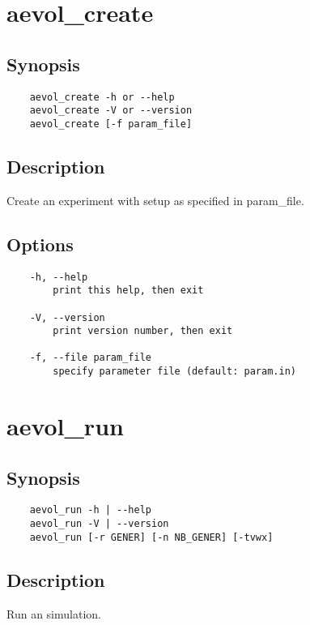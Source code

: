\label{app:manpages}


\section{aevol\_create}
\label{sec:aevol-create}

\subsection*{Synopsis}
\begin{verbatim}
    aevol_create -h or --help
   	aevol_create -V or --version
   	aevol_create [-f param_file]
\end{verbatim}

\subsection*{Description}
Create an experiment with setup as specified in param\_file.

\subsection*{Options}
\begin{verbatim}
    -h, --help
        print this help, then exit

   	-V, --version
        print version number, then exit

   	-f, --file param_file
        specify parameter file (default: param.in)
\end{verbatim}

\newpage


\section{aevol\_run}
\label{sec:aevol-run}

\subsection*{Synopsis}
\begin{verbatim}
    aevol_run -h | --help
    aevol_run -V | --version
    aevol_run [-r GENER] [-n NB_GENER] [-tvwx]
\end{verbatim}

\subsection*{Description}
Run an \aevol{} simulation.

